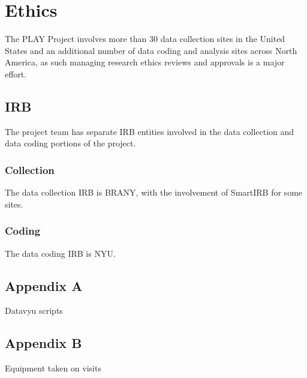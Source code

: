 \documentclass[
  12pt,
]{book}
\begin{document}
\hypertarget{part-ethics}{%
\part{Ethics}\label{part-ethics}}

The PLAY Project involves more than 30 data collection sites in the United States and an additional number of data coding and analysis sites across North America, as such managing research ethics reviews and approvals is a major effort.

\hypertarget{irb}{%
\chapter{IRB}\label{irb}}

The project team has separate IRB entities involved in the data collection and data coding portions of the project.

\hypertarget{collection}{%
\section{Collection}\label{collection}}

The data collection IRB is BRANY, with the involvement of SmartIRB for some sites.

\hypertarget{coding}{%
\section{Coding}\label{coding}}

The data coding IRB is NYU.

\hypertarget{appendix-appendix}{%
\appendix}


\hypertarget{appendix-a}{%
\chapter{Appendix A}\label{appendix-a}}

Datavyu scripts

\hypertarget{appendix-b}{%
\chapter{Appendix B}\label{appendix-b}}

Equipment taken on visits

  
\end{document}
